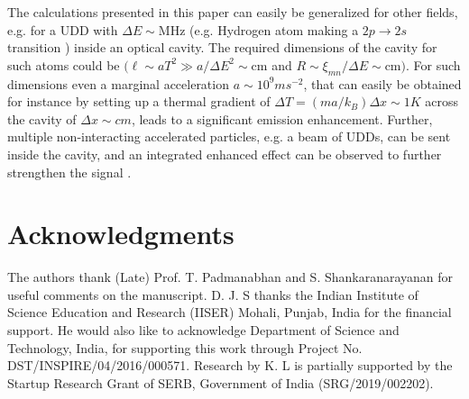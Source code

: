 \documentclass[aps,prl,nofootinbib,preprintnumbers,floatfix,twocolumn,superscriptaddress]{revtex4}
\begin{document}
The calculations presented in this paper can easily be 
generalized for other fields, e.g. for a UDD with $\Delta E \sim \text{MHz}$ (e.g. Hydrogen 
atom making a $2p \rightarrow 2s$ transition \cite{Lochan-2020})
inside an optical cavity. The required dimensions of the cavity for such atoms could be 
$(\ell \sim aT^2 \gg a/\Delta E^2 \sim \text{cm}$ 
and $R\sim \xi_{mn}/\Delta E \sim \text{cm})$. For such dimensions even a marginal 
acceleration $a\sim 10^9 ms^{-2}$, that can easily 
be obtained for instance by setting up a thermal gradient \cite{Gallina} of 
$\Delta T = (m a/k_B)\Delta x \sim 1 K$ across the cavity of $\Delta x \sim cm$, leads to a 
significant emission enhancement. Further, 
multiple non-interacting accelerated particles, e.g. a beam of UDDs, can be sent 
inside the cavity, and an integrated enhanced effect can be observed to further strengthen 
the signal \cite{Blencowe-2021}. 

\section*{Acknowledgments}
The authors thank (Late) Prof. T. Padmanabhan and S. Shankaranarayanan for 
useful comments on the manuscript. 
D. J. S thanks the Indian Institute of Science Education and Research
(IISER) Mohali, 
Punjab, India for the financial support. He would also like to acknowledge 
Department of Science and Technology, India, for supporting this work through Project 
No. DST/INSPIRE/04/2016/000571. Research by K. L is partially supported
by the Startup Research Grant of SERB, Government of India (SRG/2019/002202). 
\appendix 
\end{document}
